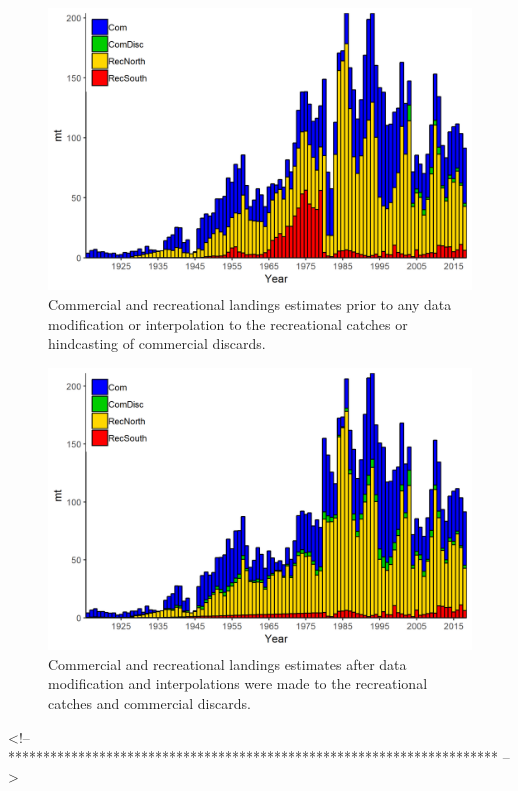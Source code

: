 \documentclass[12pt,]{article}
\begin{document}
\begin{figure}
\centering
\includegraphics{Figures/Catches_original.png}
\caption{Commercial and recreational landings estimates prior to any
data modification or interpolation to the recreational catches or
hindcasting of commercial discards. \label{fig:Catches_original}}
\end{figure}

\begin{figure}
\centering
\includegraphics{Figures/Catches_alternate.png}
\caption{Commercial and recreational landings estimates after data
modification and interpolations were made to the recreational catches
and commercial discards. \label{fig:Catches_alternate}}
\end{figure}

\FloatBarrier

\FloatBarrier

\FloatBarrier
<!-- ********************************************************************** -->
\end{document}
